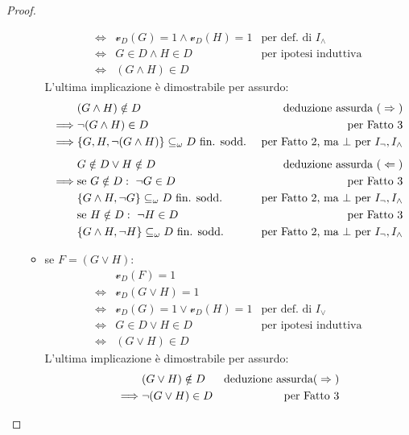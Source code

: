 \begin{proof}
\begin{itemize}
\begin{itemize}
\begin{align*}
          \iff & \mathcal{v}_D(G) = 1 \land \mathcal{v}_D(H) = 1 & \text{per def. di }I_\land \\
          \iff & G \in D \land H \in D & \text{per ipotesi induttiva} \\
          \iff & (G \land H) \in D
        \end{align*}
        L'ultima implicazione è dimostrabile per assurdo:
        \begin{align*}
          & (G \land H) \notin D & \text{deduzione assurda (} \Rightarrow \text ) \\
          \implies & \neg(G \land H) \in D & \text{per Fatto 3} \\
          \implies & \{G, H, \neg (G \land H)\} \subseteq_{\omega} D \text{ fin. sodd.} & \text{per Fatto 2, ma } \bot \text{ per } I_\neg, I_\land \\[5pt]
          & G \notin D \lor  H \notin D & \text{deduzione assurda (} \Leftarrow \text ) \\
          \implies & \text{se } G \notin D:\ \neg G \in D & \text{per Fatto 3} \\
          & \{G \land H, \neg G\} \subseteq_{\omega} D \text{ fin. sodd.} & \text{ per Fatto 2, ma } \bot \text{ per } I_\neg, I_\land \\
          & \text{se } H \notin D:\ \neg H \in D & \text{per Fatto 3} \\
          & \{G \land H, \neg H\} \subseteq_{\omega} D \text{ fin. sodd.} & \text{ per Fatto 2, ma } \bot \text{ per } I_\neg, I_\land
        \end{align*}
      \item se $F = (G \lor H):$
          \begin{align*}
            & \mathcal{v}_D(F) = 1 \\
            \iff & \mathcal{v}_D(G \lor H) = 1 \\
            \iff & \mathcal{v}_D(G) = 1 \lor \mathcal{v}_D(H) = 1 & \text{per def. di }I_\lor \\
            \iff & G \in D \lor H \in D & \text{per ipotesi induttiva} \\
            \iff & (G \lor H) \in D
          \end{align*}
          L'ultima implicazione è dimostrabile per assurdo:
          \begin{align*}
              &(G \lor H) \notin D & \text{deduzione assurda(} \Rightarrow \text ) \\
            \implies & \neg (G \lor H) \in D & \text{per Fatto 3} \\

\end{align*}
\end{itemize}
\end{itemize}
\end{proof}
